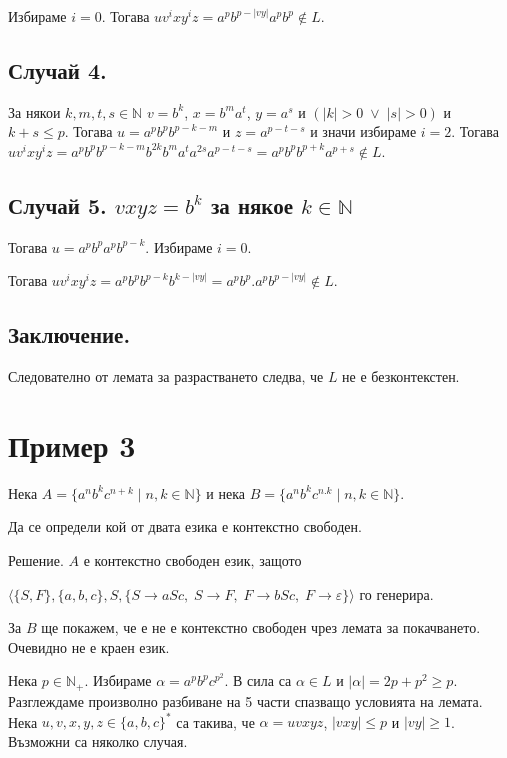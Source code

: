 \documentclass[12pt]{article}
\begin{document}
Избираме \(i = 0\). Тогава \(uv^ixy^iz = a^pb^{p - |vy|}a^pb^p \notin L\).

\subsection*{Случай 4.}
За някои \(k, m, t, s \in \mathbb N\) \(v = b^k\), \(x = b^ma^t\), \(y = a^s\) и \((|k| > 0 \;\lor\; |s| > 0)\) и \(k + s \leq p\).
Тогава \(u = a^pb^pb^{p - k - m}\) и \(z = a^{p - t - s}\) и значи избираме \(i = 2\). Тогава \(uv^ixy^iz = a^pb^pb^{p - k - m}b^{2k}b^ma^ta^{2s}a^{p - t - s } = a^pb^pb^{p + k}a^{p + s} \notin L\).

\subsection*{Случай 5. \(vxyz = b^k\) за някое \(k \in \mathbb N\)}
Тогава \(u = a^pb^pa^pb^{p - k}\). Избираме \(i = 0\).

Тогава \(uv^ixy^iz = a^pb^pb^{p - k}b^{k - |vy|} = a^pb^p.a^pb^{p - |vy|} \notin L\).

\subsection*{Заключение.}

Следователно от лемата за разрастването следва, че \(L\) не е безконтекстен.

\section*{Пример 3}
Нека \(A = \{a^nb^kc^{n + k} \mid n, k \in \mathbb{N}\}\) и нека \(B = \{a^nb^kc^{n.k} \mid n, k \in \mathbb{N}\}\).

Да се определи кой от двата езика е контекстно свободен.

Решение. \(A\) е контекстно свободен език, защото

\(\langle \{S, F\}, \{a, b, c\}, S, \{S \to aSc,\; S \to F,\;  F \to bSc,\; F \to \varepsilon\} \rangle\) го генерира.

За \(B\) ще покажем, че е не е контекстно свободен чрез лемата за покачването. Очевидно не е краен език.

Нека \(p \in \mathbb{N}_+\). Избираме \(\alpha = a^pb^pc^{p^2}\). В сила са \(\alpha \in L\) и \(|\alpha| = 2p + p^2 \geq p\).
Разглеждаме произволно разбиване на 5 части спазващо условията на лемата.
Нека \(u, v, x, y, z \in \{a, b, c\}^*\) са такива, че \(\alpha = uvxyz\), \(|vxy| \leq p\) и \(|vy| \geq 1\).
Възможни са няколко случая.
\end{document}
